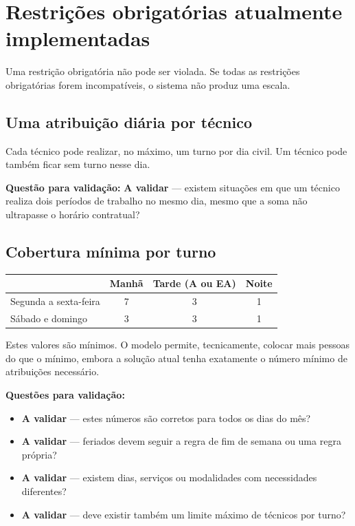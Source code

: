 \documentclass[11pt,a4paper]{article}
\newcommand{\validar}{\textcolor{blue!70!black}{\textbf{A validar}}}
\begin{document}
\section{Restrições obrigatórias atualmente implementadas}

Uma restrição obrigatória não pode ser violada. Se todas as restrições
obrigatórias forem incompatíveis, o sistema não produz uma escala.

\subsection{Uma atribuição diária por técnico}

Cada técnico pode realizar, no máximo, um turno por dia civil. Um técnico pode
também ficar sem turno nesse dia.

\textbf{Questão para validação:} \validar{} --- existem situações em que um
técnico realiza dois períodos de trabalho no mesmo dia, mesmo que a soma não
ultrapasse o horário contratual?

\subsection{Cobertura mínima por turno}

\begin{center}
\begin{tabular}{lccc}
\toprule
& \textbf{Manhã} & \textbf{Tarde (A ou EA)} & \textbf{Noite} \\
\midrule
Segunda a sexta-feira & 7 & 3 & 1 \\
Sábado e domingo      & 3 & 3 & 1 \\
\bottomrule
\end{tabular}
\end{center}

Estes valores são mínimos. O modelo permite, tecnicamente, colocar mais pessoas
do que o mínimo, embora a solução atual tenha exatamente o número mínimo de
atribuições necessário.

\textbf{Questões para validação:}
\begin{itemize}
    \item \validar{} --- estes números são corretos para todos os dias do mês?
    \item \validar{} --- feriados devem seguir a regra de fim de semana ou uma regra própria?
    \item \validar{} --- existem dias, serviços ou modalidades com necessidades diferentes?
    \item \validar{} --- deve existir também um limite máximo de técnicos por turno?
\end{itemize}
\end{document}
